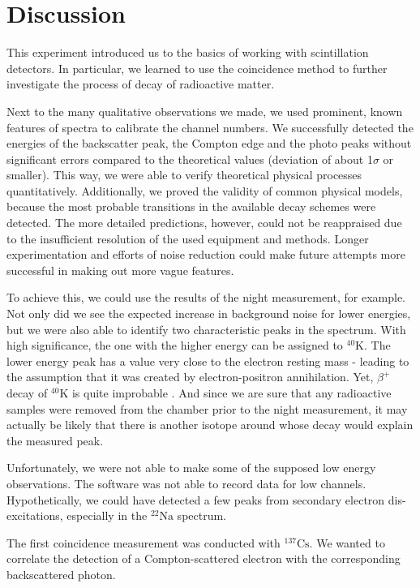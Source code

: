 \section{Discussion}
%
This experiment introduced us to the basics of working with scintillation detectors.
In particular, we learned to use the coincidence method to further investigate the process of decay of radioactive matter.
%
\par
%
Next to the many qualitative observations we made, we used prominent, known features of spectra to calibrate the channel numbers.
We successfully detected the energies of the backscatter peak, the Compton edge and the photo peaks without significant errors compared to the theoretical values (deviation of about \SI{1}{}$\sigma$ or smaller).
This way, we were able to verify theoretical physical processes quantitatively.
Additionally, we proved the validity of common physical models, because the most probable transitions in the available decay schemes were detected.
The more detailed predictions, however, could not be reappraised due to the insufficient resolution of the used equipment and methods.
Longer experimentation and efforts of noise reduction could make future attempts more successful in making out more vague features.
%
\par
%
To achieve this, we could use the results of the night measurement, for example.
Not only did we see the expected increase in background noise for lower energies, but we were also able to identify two characteristic peaks in the spectrum.
With high significance, the one with the higher energy can be assigned to $^{40}\text{K}$.
The lower energy peak has a value very close to the electron resting mass - leading to the assumption that it was created by electron-positron annihilation.
Yet, $\beta^{+}$ decay of $^{40}\text{K}$ is quite improbable \cite{WikiPotassium}.
And since we are sure that any radioactive samples were removed from the chamber prior to the night measurement, it may actually be likely that there is another isotope around whose decay would explain the measured peak.
%
\par
%
Unfortunately, we were not able to make some of the supposed low energy observations.
The software was not able to record data for low channels.
Hypothetically, we could have detected a few peaks from secondary electron dis-excitations, especially in the $^{22}\text{Na}$ spectrum.
%
\par
%
The first coincidence measurement was conducted with $^{137}\text{Cs}$.
We wanted to correlate the detection of a Compton-scattered electron with the corresponding backscattered photon.
